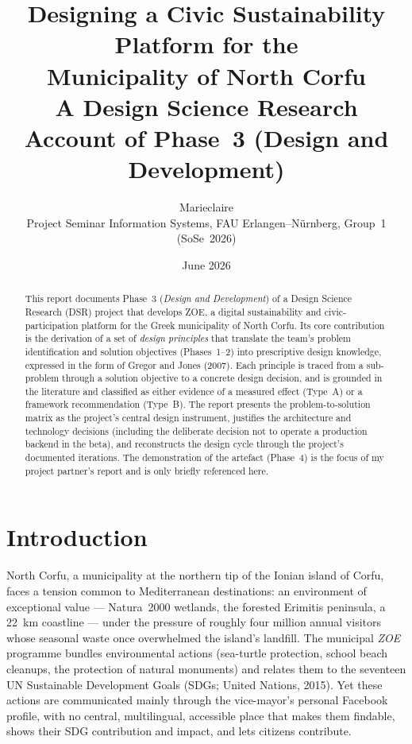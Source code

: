 \documentclass[11pt,a4paper]{article}
\title{\textbf{Designing a Civic Sustainability Platform for the\\ Municipality of North Corfu}\\[0.3em]
\large A Design Science Research Account of Phase~3 (Design and Development)}
\author{Marieclaire\\ \small Project Seminar Information Systems, FAU Erlangen--N\"urnberg, Group~1 (SoSe~2026)}
\date{June 2026}
\begin{document}
\maketitle

\begin{abstract}
\noindent This report documents Phase~3 (\emph{Design and Development}) of a Design Science Research (DSR) project that develops ZOE, a digital sustainability and civic-participation platform for the Greek municipality of North Corfu. Its core contribution is the derivation of a set of \emph{design principles} that translate the team's problem identification and solution objectives (Phases~1--2) into prescriptive design knowledge, expressed in the form of Gregor and Jones (2007). Each principle is traced from a sub-problem through a solution objective to a concrete design decision, and is grounded in the literature and classified as either evidence of a measured effect (Type~A) or a framework recommendation (Type~B). The report presents the problem-to-solution matrix as the project's central design instrument, justifies the architecture and technology decisions (including the deliberate decision not to operate a production backend in the beta), and reconstructs the design cycle through the project's documented iterations. The demonstration of the artefact (Phase~4) is the focus of my project partner's report and is only briefly referenced here.
\end{abstract}

\section{Introduction}

North Corfu, a municipality at the northern tip of the Ionian island of Corfu, faces a tension common to Mediterranean destinations: an environment of exceptional value --- Natura~2000 wetlands, the forested Erimitis peninsula, a 22~km coastline --- under the pressure of roughly four million annual visitors whose seasonal waste once overwhelmed the island's landfill. The municipal \emph{ZOE} programme bundles environmental actions (sea-turtle protection, school beach cleanups, the protection of natural monuments) and relates them to the seventeen UN Sustainable Development Goals (SDGs; United Nations, 2015). Yet these actions are communicated mainly through the vice-mayor's personal Facebook profile, with no central, multilingual, accessible place that makes them findable, shows their SDG contribution and impact, and lets citizens contribute.
\end{document}
